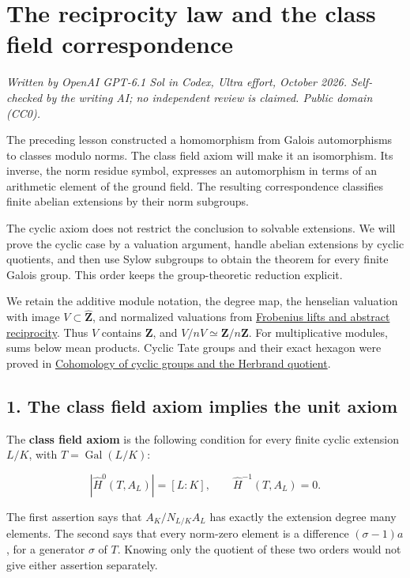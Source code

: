\documentclass[11pt,a4paper]{article}
\begin{document}
\section{The reciprocity law and the class field
correspondence}\label{the-reciprocity-law-and-the-class-field-correspondence}

\emph{Written by OpenAI GPT-6.1 Sol in Codex, Ultra effort, October
2026. Self-checked by the writing AI; no independent review is claimed.
Public domain (CC0).}

The preceding lesson constructed a homomorphism from Galois
automorphisms to classes modulo norms. The class field axiom will make
it an isomorphism. Its inverse, the norm residue symbol, expresses an
automorphism in terms of an arithmetic element of the ground field. The
resulting correspondence classifies finite abelian extensions by their
norm subgroups.

The cyclic axiom does not restrict the conclusion to solvable
extensions. We will prove the cyclic case by a valuation argument,
handle abelian extensions by cyclic quotients, and then use Sylow
subgroups to obtain the theorem for every finite Galois group. This
order keeps the group-theoretic reduction explicit.

We retain the additive module notation, the degree map, the henselian
valuation with image \(V\subset\widehat{\mathbf Z}\), and normalized
valuations from
\href{../frobenius-lifts-and-abstract-reciprocity.html}{Frobenius lifts
and abstract reciprocity}. Thus \(V\) contains \(\mathbf Z\), and
\(V/nV\simeq\mathbf Z/n\mathbf Z\). For multiplicative modules, sums
below mean products. Cyclic Tate groups and their exact hexagon were
proved in
\href{../cohomology-of-cyclic-groups-and-the-herbrand-quotient.html}{Cohomology
of cyclic groups and the Herbrand quotient}.

\subsection{1. The class field axiom implies the unit
axiom}\label{the-class-field-axiom-implies-the-unit-axiom}

The \textbf{class field axiom} is the following condition for every
finite cyclic extension \(L/K\), with \(T=\operatorname{Gal}(L/K)\):

\[
|\widehat H^0(T,A_L)|=[L:K],\qquad
\widehat H^{-1}(T,A_L)=0.
\tag{1}
\]

The first assertion says that \(A_K/N_{L/K}A_L\) has exactly the
extension degree many elements. The second says that every norm-zero
element is a difference \((\sigma-1)a\), for a generator \(\sigma\) of
\(T\). Knowing only the quotient of these two orders would not give
either assertion separately.
\end{document}
